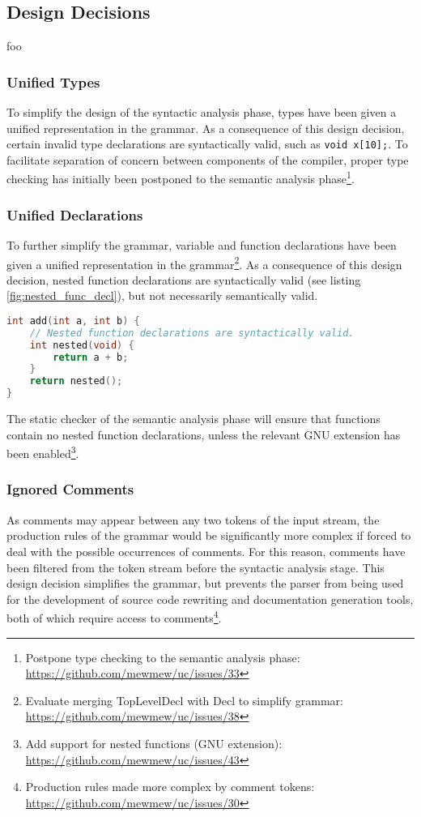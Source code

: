 \subsection{Design Decisions}

foo

\subsubsection{Unified Types}

To simplify the design of the syntactic analysis phase, types have been given a unified representation in the grammar. As a consequence of this design decision, certain invalid type declarations are syntactically valid, such as \texttt{void x[10];}. To facilitate separation of concern between components of the compiler, proper type checking has initially been postponed to the semantic analysis phase\footnote{Postpone type checking to the semantic analysis phase: \url{https://github.com/mewmew/uc/issues/33}}.

\subsubsection{Unified Declarations}

To further simplify the grammar, variable and function declarations have been given a unified representation in the grammar\footnote{Evaluate merging TopLevelDecl with Decl to simplify grammar: \url{https://github.com/mewmew/uc/issues/38}}. As a consequence of this design decision, nested function declarations are syntactically valid (see listing \ref{fig:nested_func_decl}), but not necessarily semantically valid.

\begin{lstlisting}[language=C,style=c,caption={\label{fig:nested_func_decl}Nested function declarations.}]
int add(int a, int b) {
	// Nested function declarations are syntactically valid.
	int nested(void) {
		return a + b;
	}
	return nested();
}
\end{lstlisting}

The static checker of the semantic analysis phase will ensure that functions contain no nested function declarations, unless the relevant GNU extension has been enabled\footnote{Add support for nested functions (GNU extension): \url{https://github.com/mewmew/uc/issues/43}}.

\subsubsection{Ignored Comments}

As comments may appear between any two tokens of the input stream, the production rules of the grammar would be significantly more complex if forced to deal with the possible occurrences of comments. For this reason, comments have been filtered from the token stream before the syntactic analysis stage. This design decision simplifies the grammar, but prevents the parser from being used for the development of source code rewriting and documentation generation tools, both of which require access to comments\footnote{Production rules made more complex by comment tokens: \url{https://github.com/mewmew/uc/issues/30}}.

